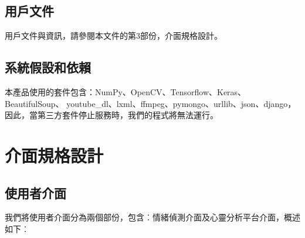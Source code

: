 \documentclass[12pt]{scrreprt}
\begin{document}
\section{用戶文件}
用戶文件與資訊，請參閱本文件的第3部份，介面規格設計。
\section{系統假設和依賴}

本產品使用的套件包含：NumPy、OpenCV、Tensorflow、Keras、BeautifulSoup、
youtube_dl、lxml、ffmpeg、pymongo、urllib、json、django，因此，當第三方套件停止服務時，我們的程式將無法運行。



\chapter{介面規格設計}

\section{使用者介面}

我們將使用者介面分為兩個部份，包含︰情緒偵測介面及心靈分析平台介面，概述如下︰
\end{document}

